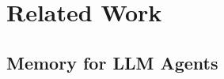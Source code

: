 \documentclass[11pt]{article}
\begin{document}




\section{Related Work}
\subsection{Memory for LLM Agents}


\end{document}
